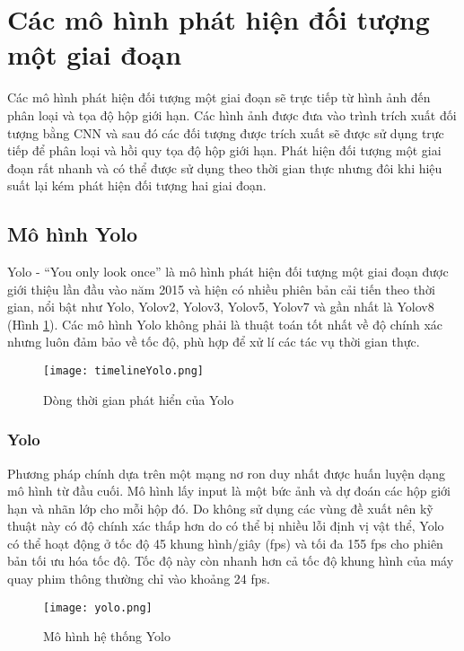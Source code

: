 \documentclass[../the.tex]{subfiles}
\begin{document}
\section{Các mô hình phát hiện đối tượng một giai đoạn}
 {\fontsize{13}{12} \selectfont
  Các mô hình phát hiện đối tượng một giai đoạn sẽ trực tiếp từ hình ảnh đến phân loại và tọa độ hộp giới hạn.
  Các hình ảnh được đưa vào trình trích xuất đối tượng bằng CNN và sau đó các đối tượng được trích xuất sẽ được sử dụng trực tiếp để phân loại và hồi quy tọa độ hộp giới hạn.
  Phát hiện đối tượng một giai đoạn rất nhanh và có thể được sử dụng theo thời gian thực nhưng đôi khi hiệu suất lại kém phát hiện đối tượng hai giai đoạn.

  \subsection{Mô hình Yolo}}
 {\fontsize{13}{12} \selectfont
  Yolo - “You only look once” \cite{redmon2016look} là mô hình phát hiện đối tượng một giai đoạn được giới thiệu lần đầu vào năm 2015 và hiện có nhiều phiên bản cải tiến theo thời gian,
  nổi bật như Yolo, Yolov2, Yolov3, Yolov5, Yolov7 và gần nhất là Yolov8 (Hình \ref{fig:timelimeyolo}). Các mô hình Yolo không phải là thuật toán tốt nhất về độ chính xác nhưng luôn đảm bảo về tốc độ, phù hợp để xử lí các tác vụ thời gian thực.
 }

\begin{figure}[H]
	\centering
	\texttt{[image: timelineYolo.png]}
	\caption{Dòng thời gian phát hiển của Yolo}
	\label{fig:timelimeyolo}
\end{figure}

\subsubsection{Yolo}
{\fontsize{13}{12} \selectfont
	Phương pháp chính dựa trên một mạng nơ ron duy nhất được huấn luyện dạng mô hình từ đầu cuối.
	Mô hình lấy input là một bức ảnh và dự đoán các hộp giới hạn và nhãn lớp cho mỗi hộp đó.
	Do không sử dụng các vùng đề xuất nên kỹ thuật này có độ chính xác thấp hơn do có thể bị nhiều lỗi định vị vật thể,
	Yolo có thể hoạt động ở tốc độ 45 khung hình/giây (fps) và tối đa 155 fps cho phiên bản tối ưu hóa tốc độ. Tốc độ này còn nhanh hơn cả tốc độ khung hình của máy quay phim thông thường chỉ vào khoảng 24 fps.

}

\begin{figure}[H]
	\centering
	\texttt{[image: yolo.png]}
	\caption{Mô hình hệ thống Yolo}
	\label{fig:yolo}
\end{figure}
\end{document}
